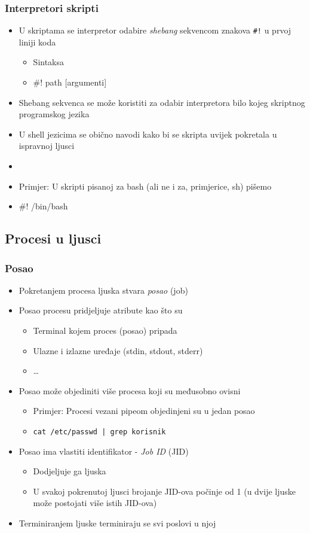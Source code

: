 \documentclass[table,usenames,dvipsnames]{beamer}
\newcommand{\shell}[1]{\texttt{#1}}
\begin{document}
\begin{frame}[t]
	\frametitle{Interpretori skripti}
	\begin{itemize}
		\item U skriptama se interpretor odabire \emph{shebang} sekvencom znakova \shell{\#!} u prvoj liniji koda
		\begin{itemize}
			\item[] Sintaksa
			\item[] {\ttfamily \#! path [argumenti]}
		\end{itemize}
		\item Shebang sekvenca se može koristiti za odabir interpretora bilo kojeg skriptnog programskog jezika
		\item U shell jezicima se obično navodi kako bi se skripta uvijek pokretala u ispravnoj ljusci
		\item[]
		\item Primjer: U skripti pisanoj za bash (ali ne i za, primjerice, sh) pišemo
		\item[] \ttfamily \#! /bin/bash
	\end{itemize}
\end{frame}

\subsection{Procesi u ljusci}
\begin{frame}[t]
	\frametitle{Posao}
	\begin{itemize}
	  \item Pokretanjem procesa ljuska stvara \emph{posao} (job)
	  \item Posao procesu pridjeljuje atribute kao što su
	  \begin{itemize}
	  	\item Terminal kojem proces (posao) pripada
	  	\item Ulazne i izlazne uređaje (stdin, stdout, stderr)
	  	\item \ldots
	  \end{itemize}
	  \item Posao može objediniti više procesa koji su međusobno ovisni
	  \begin{itemize}
	  	\item[] Primjer: Procesi vezani pipeom objedinjeni su u jedan posao
	  	\item[] \shell{cat /etc/passwd | grep korisnik}
	  \end{itemize}
	  \item Posao ima vlastiti identifikator - \emph{Job ID} (JID)
	  \begin{itemize}
	  	\item Dodjeljuje ga ljuska
	  	\item U svakoj pokrenutoj ljusci brojanje JID-ova počinje od 1 (u dvije ljuske može postojati više istih JID-ova)
	  \end{itemize}
	\item Terminiranjem ljuske terminiraju se svi poslovi u njoj
	\end{itemize}
\end{frame}
\end{document}
